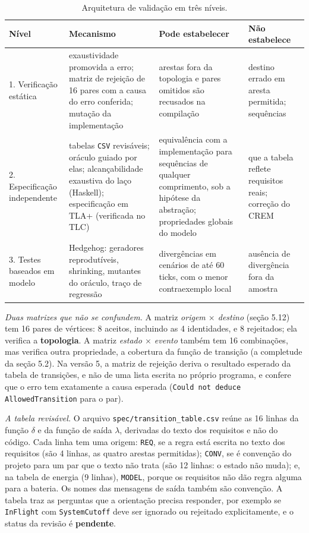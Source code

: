 \documentclass[12pt,a4paper]{article}
\begin{document}
\begin{table}[h]
\centering
\footnotesize
\begin{tabular}{|p{2.3cm}|p{5.2cm}|p{3.4cm}|p{3.0cm}|}
\hline
Nível & Mecanismo & Pode estabelecer & Não estabelece \\
\hline
1. Verificação estática & exaustividade promovida a erro; matriz de rejeição de 16 pares com a causa do erro conferida; mutação da implementação & arestas fora da topologia e pares omitidos são recusados na compilação & destino errado em aresta permitida; sequências \\
\hline
2. Especificação independente & tabelas \texttt{CSV} revisáveis; oráculo guiado por elas; alcançabilidade exaustiva do laço (Haskell); especificação em TLA+ (verificada no TLC) & equivalência com a implementação para sequências de qualquer comprimento, sob a hipótese da abstração; propriedades globais do modelo & que a tabela reflete requisitos reais; correção do CREM \\
\hline
3. Testes baseados em modelo & Hedgehog: geradores reprodutíveis, shrinking, mutantes do oráculo, traço de regressão & divergências em cenários de até 60 ticks, com o menor contraexemplo local & ausência de divergência fora da amostra \\
\hline
\end{tabular}
\caption{Arquitetura de validação em três níveis.}
\label{tab:niveis}
\end{table}

\textit{Duas matrizes que não se confundem.} A matriz \textit{origem $\times$ destino} (seção 5.12) tem 16 pares de vértices: 8 aceitos, incluindo as 4 identidades, e 8 rejeitados; ela verifica a \textbf{topologia}. A matriz \textit{estado $\times$ evento} também tem 16 combinações, mas verifica outra propriedade, a cobertura da função de transição (a completude da seção 5.2). Na versão 5, a matriz de rejeição deriva o resultado esperado da tabela de transições, e não de uma lista escrita no próprio programa, e confere que o erro tem exatamente a causa esperada (\texttt{Could not deduce AllowedTransition} para o par).

\textit{A tabela revisável.} O arquivo \texttt{spec/transition\_table.csv} reúne as 16 linhas da função $\delta$ e da função de saída $\lambda$, derivadas do texto dos requisitos e não do código. Cada linha tem uma origem: \texttt{REQ}, se a regra está escrita no texto dos requisitos (são 4 linhas, as quatro arestas permitidas); \texttt{CONV}, se é convenção do projeto para um par que o texto não trata (são 12 linhas: o estado não muda); e, na tabela de energia (9 linhas), \texttt{MODEL}, porque os requisitos não dão regra alguma para a bateria. Os nomes das mensagens de saída também são convenção. A tabela traz as perguntas que a orientação precisa responder, por exemplo se \texttt{InFlight} com \texttt{SystemCutoff} deve ser ignorado ou rejeitado explicitamente, e o status da revisão é \textbf{pendente}.
\end{document}
